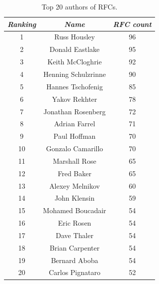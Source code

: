 \documentclass[a4paper,english]{report}
\begin{document}
\begin{center}
\begin{table}
\centering
 \begin{tabular}{||c | c | c||} 
 \hline
\textit{Ranking} & \textit{Name} & \textit{RFC count} \\ [1ex] 
 \hline\hline
1 & Russ Housley & 96\\
\hline

2 & Donald Eastlake & 95\\
\hline

3 & Keith McCloghrie & 92\\
\hline

4 & Henning Schulzrinne & 90\\
\hline

5 & Hannes Tschofenig & 85\\
\hline

6 & Yakov Rekhter & 78\\
\hline

7 & Jonathan Rosenberg & 72\\
\hline

8 & Adrian Farrel & 71\\
\hline

9 & Paul Hoffman & 70\\
\hline

10 & Gonzalo Camarillo & 70\\
\hline

11 & Marshall Rose & 65\\
\hline

12 & Fred Baker & 65\\
\hline

13 & Alexey Melnikov & 60\\
\hline

14 & John Klensin & 59\\
\hline

15 & Mohamed Boucadair & 54\\
\hline

16 & Eric Rosen & 54\\
\hline

17 & Dave Thaler & 54\\
\hline

18 & Brian Carpenter & 54\\
\hline

19 & Bernard Aboba & 54\\
\hline

20 & Carlos Pignataro & 52\\
\hline


\end{tabular}

\caption{Top 20 authors of RFCs.}
\end{table}
\end{center}
\end{document}
